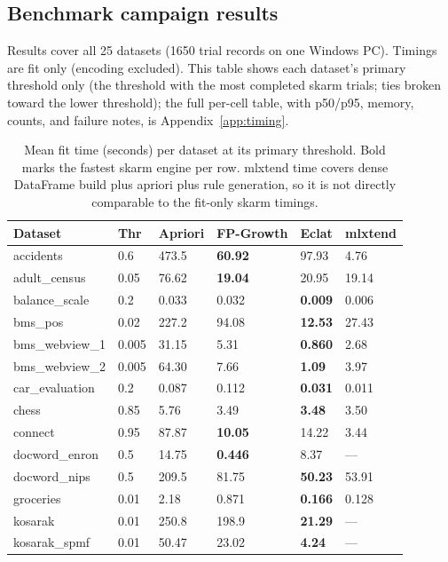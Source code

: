 \documentclass[twocolumn,10pt]{article}
\begin{document}
\subsection{Benchmark campaign results}
Results cover all 25 datasets (1650 trial records on one Windows PC). Timings are fit only (encoding excluded). This table shows each dataset's primary threshold only (the threshold with the most completed skarm trials; ties broken toward the lower threshold); the full per-cell table, with p50/p95, memory, counts, and failure notes, is Appendix~\ref{app:timing}.

\begin{table}[t]
\centering
\footnotesize
\caption{Mean fit time (seconds) per dataset at its primary threshold. Bold marks the fastest skarm engine per row. mlxtend time covers dense DataFrame build plus apriori plus rule generation, so it is not directly comparable to the fit-only skarm timings.}
\label{tab:timing}
\begin{tabular}{llllll}
\toprule
Dataset & Thr & Apriori & FP-Growth & Eclat & mlxtend \\
\midrule
accidents & 0.6 & 473.5 & \textbf{60.92} & 97.93 & 4.76 \\
adult\_\allowbreak{}census & 0.05 & 76.62 & \textbf{19.04} & 20.95 & 19.14 \\
balance\_\allowbreak{}scale & 0.2 & 0.033 & 0.032 & \textbf{0.009} & 0.006 \\
bms\_\allowbreak{}pos & 0.02 & 227.2 & 94.08 & \textbf{12.53} & 27.43 \\
bms\_\allowbreak{}webview\_\allowbreak{}1 & 0.005 & 31.15 & 5.31 & \textbf{0.860} & 2.68 \\
bms\_\allowbreak{}webview\_\allowbreak{}2 & 0.005 & 64.30 & 7.66 & \textbf{1.09} & 3.97 \\
car\_\allowbreak{}evaluation & 0.2 & 0.087 & 0.112 & \textbf{0.031} & 0.011 \\
chess & 0.85 & 5.76 & 3.49 & \textbf{3.48} & 3.50 \\
connect & 0.95 & 87.87 & \textbf{10.05} & 14.22 & 3.44 \\
docword\_\allowbreak{}enron & 0.5 & 14.75 & \textbf{0.446} & 8.37 & --- \\
docword\_\allowbreak{}nips & 0.5 & 209.5 & 81.75 & \textbf{50.23} & 53.91 \\
groceries & 0.01 & 2.18 & 0.871 & \textbf{0.166} & 0.128 \\
kosarak & 0.01 & 250.8 & 198.9 & \textbf{21.29} & --- \\
kosarak\_\allowbreak{}spmf & 0.01 & 50.47 & 23.02 & \textbf{4.24} & --- \\

\end{tabular}
\end{table}
\end{document}
